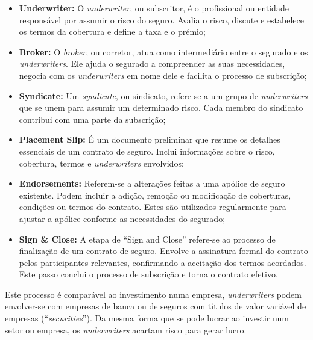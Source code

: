             \begin{itemize}
                \item \textbf{Underwriter:} O \textit{underwriter}, ou subscritor, é o profissional ou entidade responsável por assumir o risco do seguro. Avalia o risco, discute e estabelece os termos da cobertura e define a taxa e o prémio;
                
                \item \textbf{Broker:} O \textit{broker}, ou corretor, atua como intermediário entre o segurado e os \textit{underwriters}. Ele ajuda o segurado a compreender as suas necessidades, negocia com os \textit{underwriters} em nome dele e facilita o processo de subscrição;
                
                \item \textbf{Syndicate:} Um \textit{syndicate}, ou sindicato, refere-se a um grupo de \textit{underwriters} que se unem para assumir um determinado risco. Cada membro do sindicato contribui com uma parte da subscrição;
                
                \item \textbf{Placement Slip:} É um documento preliminar que resume os detalhes essenciais de um contrato de seguro. Inclui informações sobre o risco, cobertura, termos e \textit{underwriters} envolvidos;
                
                \item \textbf{Endorsements:} Referem-se a alterações feitas a uma apólice de seguro existente. Podem incluir a adição, remoção ou modificação de coberturas, condições ou termos do contrato. Estes são utilizados regularmente para ajustar a apólice conforme as necessidades do segurado;
    
                \item \textbf{Sign \& Close:} A etapa de ``Sign and Close'' refere-se ao processo de finalização de um contrato de seguro. Envolve a assinatura formal do contrato pelos participantes relevantes, confirmando a aceitação dos termos acordados. Este passo conclui o processo de subscrição e torna o contrato efetivo.

            \end{itemize}

            Este processo é comparável ao investimento numa empresa, \textit{underwriters} podem envolver-se com empresas de banca ou de seguros com títulos de valor variável de empresas (``\textit{securities}''). Da mesma forma que se pode lucrar ao investir num setor ou empresa, os \textit{underwriters} acartam risco para gerar lucro\cite{underwriting-insurance-loans-ipos-etc-explained-in-one-minute}.
    
